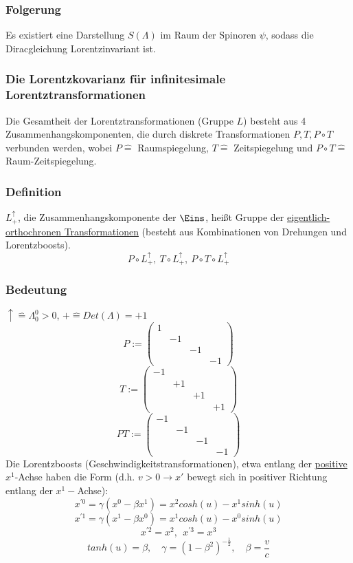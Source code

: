 \documentclass[twoside,a4paper]{scrartcl}
\renewcommand{\1}{\mathds{1}}
\newcommand{\ra}{\rightarrow}
\newcommand{\entspricht}{\mathrel{\widehat{=}}}
\renewcommand{\L}{\Lambda}
\begin{document}
\subsubsection*{Folgerung}
Es existiert eine Darstellung $S(\L)$ im Raum der Spinoren $\psi$, sodass die Diracgleichung Lorentzinvariant ist.

\subsubsection{Die Lorentzkovarianz für infinitesimale Lorentztransformationen}
Die Gesamtheit der Lorentztransformationen (Gruppe $L$) besteht aus 4 Zusammenhangskomponenten, die durch diskrete Transformationen $P,T,P\circ T$ verbunden werden, wobei $P\entspricht$ Raumspiegelung, $T\entspricht$ Zeitspiegelung und $P\circ T\entspricht$ Raum-Zeitspiegelung.
\subsubsection*{Definition}
 $L_+^\uparrow$, die Zusammenhangskomponente der $\Eins$, heißt Gruppe der \underline{eigentlich-orthochronen Transformationen} (besteht aus Kombinationen von Drehungen und Lorentzboosts).
$$P\circ L_+^\uparrow, \ T \circ L_+^\uparrow, \ P \circ T \circ L_+^\uparrow$$
\subsubsection*{Bedeutung}
$\uparrow \entspricht \L_0^0 >0$, $+\entspricht Det(\L)=+1$
$$P:= \begin{pmatrix}1 \\ & -1 \\ & & -1 \\ & & & -1\end{pmatrix}$$
$$T:= \begin{pmatrix}-1 \\ & +1 \\ & & +1 \\ & & & +1\end{pmatrix}$$
$$PT:= \begin{pmatrix}-1 \\ & -1 \\ & & -1 \\ & & & -1\end{pmatrix}$$
Die Lorentzboosts (Geschwindigkeitstransformationen), etwa entlang der \underline{positive} $x^1$-Achse haben die Form (d.h. $v>0 \ra x'$ bewegt sich in positiver Richtung entlang der $x^1-$Achse):
$$x^{'0}=\gamma(x^0-\beta x^1)=x^2 cosh(u)-x^1 sinh(u)$$
$$x^{'1}=\gamma(x^1-\beta x^0)=x^1 cosh(u)-x^0 sinh(u)$$
$$x^{'2}=x^2, \ \ x^{'3}=x^3$$
$$ tanh(u)=\beta, \quad \gamma=(1-\beta^2)^{-\frac{1}{2}}, \quad \beta=\frac{v}{c}$$
\end{document}
